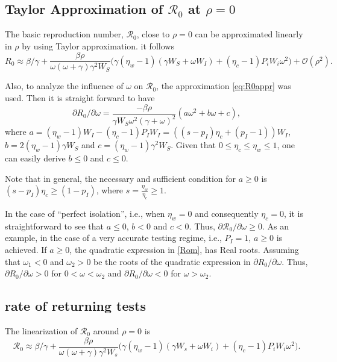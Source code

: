 \documentclass[12pt]{article}
\newcommand{\Rnum}{\mathcal{R}_0}
\theoremstyle{definition} %
\begin{document}
\subsection{Taylor Approximation of $\Rnum$ at $\rho=0$ }
The basic reproduction number, $\Rnum$, close to $\rho=0$ can be approximated linearly in $\rho$ by using Taylor approximation. it follows
\begin{equation}
\label{eq:R0appr}
R_0 \approx \beta/\gamma + \frac{\beta \rho}{\omega (\omega+\gamma) \gamma^2 W_S} \Big(\gamma(\eta_w-1)(\gamma W_S+\omega W_I) + (\eta_c -1)P_iW_i \omega^2 \Big) + \mathcal{O}(\rho^2).
\end{equation}

Also, to analyze the influence of $\omega$ on $\Rnum$, the approximation \eqref{eq:R0appr} was used. Then it is straight forward to have
\begin{equation}
\label{Rom}
\partial{R_0}/\partial{\omega}=  \frac{-\beta \rho}{\gamma W_S\omega^2 (\gamma+\omega)^2}  (a \omega^2 + b \omega + c),
\end{equation}
where $a=(\eta_w-1)W_I-(\eta_c-1)P_I W_I = ((s-p_I)\eta_c + (p_I-1)) W_I$, $b=2(\eta_w-1)\gamma W_S$ and $c=(\eta_w-1)\gamma^2 W_S$.
Given that $0 \leq \eta_c\leq \eta_w \leq 1 $, one can easily derive $b\leq 0$ and $c \leq 0$. 

Note that in general, the necessary and sufficient condition for $a \geq 0$ is $(s-p_I) \eta_c \geq (1-p_I)$, where $s=\frac{\eta_w}{\eta_c} \geq 1$. 

In the case of ``perfect isolation'', i.e., when $\eta_w=0$ and consequently $\eta_c=0$, it is straightforward to see that $a \leq 0$, $b<0$ and $c<0$. Thus, $\partial{\Rnum}/\partial{\omega} \geq 0$. 
As an example, in the case of a very accurate testing regime,  i.e., $P_I=1$, $a \geq 0$ is achieved. If $a\geq 0$, the quadratic expression in \eqref{Rom}, has Real roots. Assuming that $\omega_1<0$ and $\omega_2>0$ be the roots of the quadratic expression in $\partial{R_0}/\partial{\omega}$. Thus, $\partial{R_0}/\partial{\omega}>0$ for $0<\omega<\omega_2$ and  $\partial{R_0}/\partial{\omega}<0$ for $\omega>\omega_2$.

\subsection{rate of returning tests}
The linearization of $\Rnum$ around $\rho=0$ is
\begin{equation}\label{linearization}
\Rnum \approx \beta/\gamma + \frac{\beta \rho}{\omega (\omega+\gamma) \gamma^2 W_s} \Big(\gamma(\eta_w-1)(\gamma W_s+\omega W_i) + (\eta_c -1)P_iW_i \omega^2 \Big). 
\end{equation}
\end{document}
